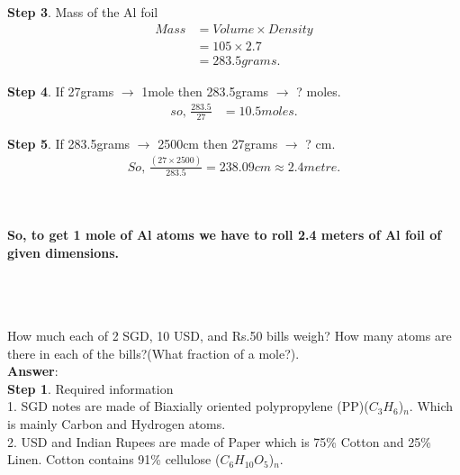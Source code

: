 \documentclass[11pt]{exam}
\begin{document}
\begin{questions}
{\begin{minipage}{28em}
\textbf{Step 3}. Mass of the Al foil 
\begin{align*} 
Mass &= Volume \times Density\\
     &= 105 \times 2.7\\
     &= 283.5 grams.
\end{align*}  
                
\textbf{Step 4}. If 27grams $\rightarrow$ 1mole then 283.5grams $\rightarrow$ ? moles.
                 \begin{align*}
                  so,\, \frac{283.5}{27} &= 10.5 moles.
                 \end{align*} 
                
\textbf{Step 5}. If 283.5grams $\rightarrow$ 2500cm then 27grams $\rightarrow$ ? cm.
                \begin{align*}                
                So,\, \frac{(27 \times 2500)}{283.5} = 238.09 cm \approx 2.4 metre.
                \end{align*}
\end{minipage}} \\ \\ 

                  
\textbf{So, to get 1 mole of Al atoms we have to roll 2.4 meters of Al foil of given dimensions.} \\ \\ \\ \\


\question
\label{Q2:Dollar bills}

How much each of 2 SGD, 10 USD, and Rs.50 bills weigh? How many atoms are there in each of the bills?(What fraction of a mole?).\\
\textbf{Answer}: \\ 
\textbf{Step 1}. Required information\\ 

                 1. SGD notes are made of Biaxially oriented polypropylene (PP)($C_{3}H_{6}$)$_{n}$. Which is mainly Carbon and Hydrogen atoms.\\
                 
                 2. USD and Indian Rupees are made of Paper which is 75\% Cotton and 25\% Linen. Cotton contains 91\% cellulose ($C_{6}H_{10}O_{5}$)$_{n}$.\\ 
                 

\end{questions}
\end{document}
